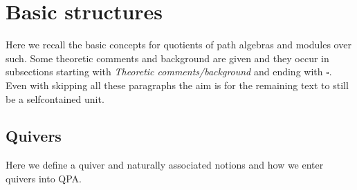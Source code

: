 \documentclass{amsart}
\theoremstyle{definition}
\theoremstyle{theoretic}
\begin{document}
\section{Basic structures}

Here we recall the basic concepts for quotients of path algebras and
modules over such.  Some theoretic comments and background are given
and they occur in subsections starting with \emph{Theoretic
  comments/background} and ending with $\square$.  Even with skipping
all these paragraphs the aim is for the remaining text to still be a
selfcontained unit.

\subsection{Quivers}
Here we define a quiver and naturally associated notions and how we
enter quivers into QPA.
\end{document}
